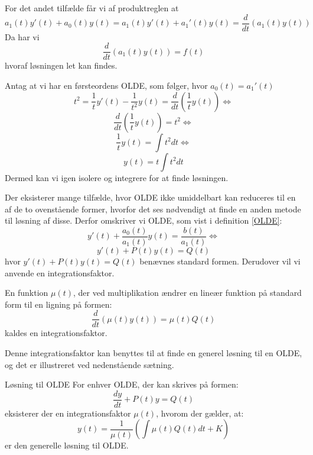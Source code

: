 For det andet tilfælde får vi af produktreglen at $$a_1(t)y'(t) + a_0(t)y(t) = a_1(t)y'(t) + a_1'(t)y(t) = \frac{d}{dt}(a_1(t)y(t))$$Da har vi $$\frac{d}{dt}(a_1(t)y(t)) = f(t)$$ hvoraf løsningen let kan findes.

\begin{Example} \hfill \break
\textnormal{Antag at vi har en førsteordens OLDE, som følger, hvor $a_0(t) = a_1'(t)$} \\
\hfill \break
$$t^2 = \frac{1}{t}y'(t) -\frac{1}{t^2}y(t) = \frac{d}{dt}(\frac{1}{t}y(t))\Leftrightarrow$$
$$\frac{d}{dt}(\frac{1}{t}y(t)) = t^2\Leftrightarrow$$
$$\frac{1}{t}y(t) = \int t^2dt \Leftrightarrow$$ $$ y(t) = t \int t^2dt$$
\hfill \break
\textnormal{Dermed kan vi igen isolere og integrere for at finde løsningen.}
\end{Example}

Der eksisterer mange tilfælde, hvor OLDE ikke umiddelbart kan reduceres til en af de to ovenstående former, hvorfor det ses nødvendigt at finde en anden metode til løsning af disse. Derfor omskriver vi OLDE, som vist i definition \ref{OLDE}: $${y'(t) + \frac{a_0(t)}{a_1(t)}y(t) = \frac{b(t)}{a_1(t)}} \Leftrightarrow$$
$$y'(t) + P(t)y(t) = Q(t)$$ hvor $y'(t) + P(t)y(t) = Q(t)$ benævnes standard formen. Derudover vil vi anvende en integrationsfaktor.

\begin{definition}[Integrationsfaktor]
\label{integrationsfaktor}
En funktion $\mu (t)$, der ved multiplikation ændrer en lineær funktion på standard form til en ligning på formen: $$\frac{d}{dt}(\mu (t)y(t)) = \mu (t)Q(t)$$ kaldes en integrationsfaktor.
\end{definition}

Denne integrationsfaktor kan benyttes til at finde en generel løsning til en OLDE, og det er illustreret ved nedenstående sætning.

\begin{mytheo}{Løsning til OLDE}{}
For enhver OLDE, der kan skrives på formen: $$\frac{dy}{dt}+P(t)y=Q(t)$$ eksisterer der en integrationsfaktor $\mu(t)$, hvorom der gælder, at: $$y(t)=\frac{1}{\mu (t)}(\int \mu (t)Q(t)dt+K)$$ er den generelle løsning til OLDE.
\end{mytheo}


